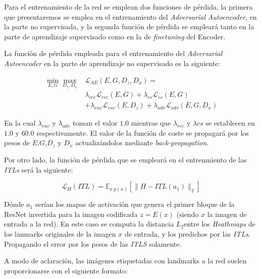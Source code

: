         \noindent Para el entrenamiento de la red se emplean dos funciones de pérdida, la primera que presentaremos se emplea en el entrenamiento del \textit{Adversarial Autoencoder}, en la parte no supervisada, y la segunda función de pérdida se empleará tanto en la parte de aprendizaje supervisado como en la de \textit{finetuning} del Encoder.

        \medskip

        \noindent La función de pérdida empleada para el entrenamiento del \textit{Adversarial Autoencoder} en la parte de aprendizaje no supervisado es la siguiente: 
        
        \begin{align*}
            \min_{E,G} \max_{D_z,D_x} & \mathcal{L}_{AE}(E,G,D_z,D_x) = \\
            & \lambda_{rec} \mathcal{L}_{rec}(E,G) + \lambda_{cs}\mathcal{L}_{cs}(E,G) \\
            & + \lambda_{enc}\mathcal{L}_{enc}(E,D_z)+ \lambda_{adv} \mathcal{L}_{adv}(E,G,D_x)
        \end{align*}

        \noindent En la cual $\lambda_{enc}$ y $\lambda_{adv}$ toman el valor $1.0$ mientras que $\lambda_{rec}$ y $\lambda{cs}$ se establecen en $1.0$ y $60.0$ respectivamente. El valor de la función de coste se propagará por los pesos de $E$,$G$,$D_z$ y $D_x$ actualizándolos mediante \textit{back-propagation}.

        \medskip

        \noindent Por otro lado, la función de pérdida que se empleará en el entrenmiento de las \textit{ITLs} será la siguiente: 

        \begin{equation} \label{eq::L2}
            \mathcal{L}_H(ITL) = \mathbb{E}_{x ~ p(x)} \left[ \| H-ITL(a_1)\|_2 \right]
        \end{equation}

        \noindent Dónde $a_1$ serían los mapas de activación que genera el primer bloque de la ResNet invertida para la imagen codificada $z=E(x)$ (siendo $x$ la imagen de entrada a la red). En este caso se computa la distancia \textbf{$L_2$}entre los \textit{Heathmaps} de los lanmarks originales de la imagen $x$ de entrada, y los predichos por las \textit{ITLs}. Propagando el error por los pesos de las \textit{ITLS} solamente.

        \medskip

        \noindent A modo de aclaración, las imágenes etiquetadas con landmarks a la red suelen proporcionarse con el siguiente formato: 

